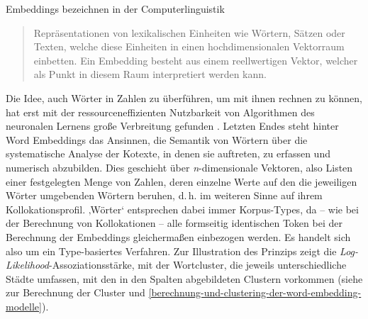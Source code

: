 \label{was-sind-word-embeddings}

Embeddings bezeichnen in der Computerlinguistik

\begin{quote}
Repräsentationen von lexikalischen Einheiten wie Wörtern, Sätzen oder Texten, welche diese Einheiten in einen hochdimensionalen Vektorraum einbetten. Ein Embedding besteht aus einem reellwertigen Vektor, welcher als Punkt in diesem Raum interpretiert werden kann. \autocite[218]{biemannWissensrohstoffTextEinfuehrung2022}
\end{quote}

Die Idee, auch Wörter in Zahlen zu überführen, um mit ihnen rechnen zu können, hat erst mit der ressourceneffizienten Nutzbarkeit von Algorithmen des neuronalen Lernens große Verbreitung gefunden \autocite[siehe zu einem Überblick zu früheren Ansätzen etwa][]{widdowsGeometryMeaning2004}. Letzten Endes steht hinter Word Embeddings das Ansinnen, die Semantik von Wörtern über die systematische Analyse der Kotexte, in denen sie auftreten, zu erfassen und numerisch abzubilden. Dies geschieht über \emph{n}-dimensionale Vektoren, also Listen einer festgelegten Menge von Zahlen, deren einzelne Werte auf den die jeweiligen Wörter umgebenden Wörtern beruhen, d.\,h. im weiteren Sinne auf ihrem Kollokationsprofil. ‚Wörter` entsprechen dabei immer Korpus-Types, da – wie bei der Berechnung von Kollokationen – alle formseitig identischen Token bei der Berechnung der Embeddings gleichermaßen einbezogen werden. Es handelt sich also um ein Type-basiertes Verfahren. Zur Illustration des Prinzips zeigt  die \emph{Log-Likelihood}-Assoziationsstärke, mit der Wortcluster, die jeweils unterschiedliche Städte umfassen, mit den in den Spalten abgebildeten Clustern vorkommen (siehe zur Berechnung der Cluster  und \ref{berechnung-und-clustering-der-word-embedding-modelle}).


